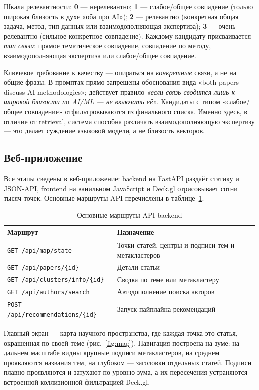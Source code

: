 Шкала релевантности: \textbf{0} — нерелевантно; \textbf{1} — слабое/общее совпадение (только широкая
близость в духе «оба про AI»); \textbf{2} — релевантно (конкретная общая задача, метод, тип данных
или взаимодополняющая экспертиза); \textbf{3} — очень релевантно (сильное конкретное совпадение).
Каждому кандидату присваивается \emph{тип связи}: прямое тематическое совпадение, совпадение по
методу, взаимодополняющая экспертиза или слабое/общее совпадение.

Ключевое требование к качеству — опираться на \emph{конкретные} связи, а не на общие фразы. В
промптах прямо запрещены обоснования вида «both papers discuss AI methodologies»; действует правило
\emph{«если связь сводится лишь к широкой близости по AI/ML — не включать её»}. Кандидаты с типом
«слабое/общее совпадение» отфильтровываются из финального списка. Именно здесь, в отличие от
retrieval, система способна различать взаимодополняющую экспертизу — это делает суждение языковой
модели, а не близость векторов.

\subsection{Веб-приложение}
\label{sec:web}

Все этапы сведены в веб-приложение: backend на FastAPI раздаёт статику и JSON-API, frontend на
ванильном JavaScript и Deck.gl отрисовывает сотни тысяч точек. Основные маршруты API перечислены
в таблице~\ref{tab:api}.

\begin{table}[ht]
\caption{Основные маршруты API backend}
\label{tab:api}
\centering
\footnotesize
\begin{tabular}{ll}
\toprule
Маршрут & Назначение \\
\midrule
\texttt{GET /api/map/state} & Точки статей, центры и подписи тем и метакластеров \\
\texttt{GET /api/papers/\{id\}} & Детали статьи \\
\texttt{GET /api/clusters/info/\{id\}} & Сводка по теме или метакластеру \\
\texttt{GET /api/authors/search} & Автодополнение поиска авторов \\
\texttt{POST /api/recommendations/\{id\}} & Запуск пайплайна рекомендаций \\
\bottomrule
\end{tabular}
\end{table}

Главный экран — карта научного пространства, где каждая точка это статья, окрашенная по своей теме
(рис.~\ref{fig:map}). Навигация построена на зуме: на дальнем масштабе видны крупные подписи
метакластеров, на среднем проявляются названия тем, на глубоком — заголовки отдельных статей.
Подписи плавно проявляются и затухают по уровню зума, а их пересечения устраняются встроенной
коллизионной фильтрацией Deck.gl.

